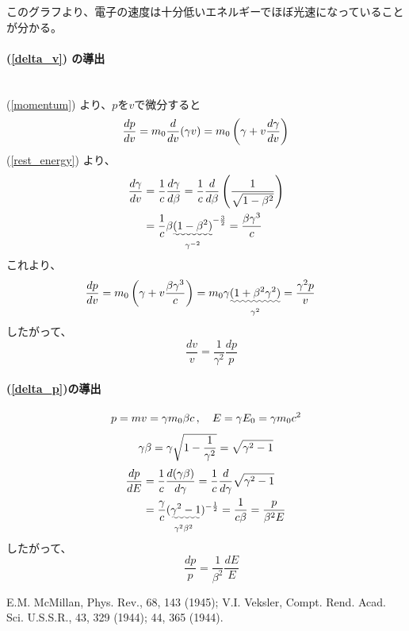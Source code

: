 \documentclass[]{jlreq}
\begin{document}
このグラフより、電子の速度は十分低いエネルギーでほぼ光速になっていることが分かる。
%
\paragraph{(\ref{delta_v}) の導出} \leavevmode\\

(\ref{momentum}) より、$p$を$v$で微分すると
%
\begin{equation}
  \frac{dp}{dv} = m_0\frac{d}{dv}(\gamma v)
  = m_0 \left(\gamma + v \frac{d\gamma}{dv}\right) \notag
\end{equation}
%
(\ref{rest_energy}) より、
%
\begin{align}
  \frac{d\gamma}{dv} & = \frac{1}{c}\frac{d\gamma}{d\beta}= \frac{1}{c}\frac{d}{d\beta}\left(\frac{1}{\sqrt{1-\beta^2}}\right) \notag \\
  & = \frac{1}{c} \beta \underset{\gamma^{-2}}{\uwave{(1-\beta^2)}}^{-\frac{3}{2}} = \frac{\beta \gamma^3}{c} \notag
\end{align}
%
これより、
\begin{align}
  \frac{dp}{dv} & = m_0 \left(\gamma + v \frac{\beta \gamma^3}{c}\right)
  = m_0 \gamma \underset{\gamma^2}{\uwave{(1 + \beta^2 \gamma^2)}}
  = \frac{\gamma^2 p}{v} \notag
\end{align}
%
したがって、
%
\begin{equation}
  \quad \frac{dv}{v} = \frac{1}{\gamma^2}\frac{dp}{p}
  \label{dv_dp}
\end{equation}
%
\paragraph{(\ref{delta_p})の導出}
%
\begin{align}
  p = mv = \gamma m_0 \beta c\,  , \quad E = \gamma E_0 = \gamma m_0 c^2 \notag
\end{align}
%
\begin{equation}
  \gamma \beta = \gamma \sqrt{1-\frac{1}{\gamma^2}} \notag = \sqrt{\gamma^2 -1} \notag
\end{equation}
%
\begin{align}
  \frac{dp}{dE} & = \frac{1}{c}\frac{d(\gamma \beta)}{d\gamma} = \frac{1}{c}\frac{d}{d\gamma}\sqrt{\gamma^2 -1} \notag \\
  & = \frac{\gamma}{c} \underset{\gamma^2\beta^2}{(\uwave{\gamma^2 -1}})^{-\frac{1}{2}} = \frac{1}{c\beta}
  = \frac{p}{\beta^2 E}\notag
\end{align}
%
したがって、
%
\begin{equation}
  \quad \frac{dp}{p} = \frac{1}{\beta^2}\frac{dE}{E}
  \label{dp_de}
\end{equation}

%
\begin{thebibliography}{9}
  E.M. McMillan, Phys. Rev., 68, 143 (1945); V.I. Veksler, Compt. Rend. Acad. Sci. U.S.S.R., 43, 329 (1944); 44, 365 (1944).

\end{thebibliography}
%
\end{document}

